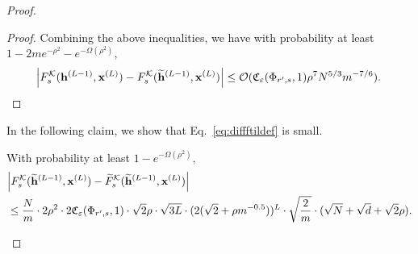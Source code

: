\begin{claim}
\begin{proof}
\begin{proof}
					
					
					Combining the above inequalities, we have with probability at least $1 - 2me^{-\rho^2} - e^{-\Omega(\rho^2)}$,
					\begin{equation*}
						\abs{F^{\mathcal{K}}_s(\mathbf{h}^{(L-1)}, \mathbf{x}^{(L)}) - F^{\mathcal{K}}_s(\widetilde{\mathbf{h}}^{(L-1)}, \mathbf{x}^{(L)})} \le \mathcal{O}( \mathfrak{C}_{\varepsilon}(\Phi_{r', s}, 1) \rho^{7} N^{5 / 3} m^{-7/6}).
					\end{equation*}
				\end{proof}
				
				
				In the following claim, we show that Eq.~\ref{eq:diffftildef} is small.      
				\begin{claim}\label{claim:diffftildef}
					With probability at least $1-e^{-\Omega(\rho^2)}$,
					\begin{align*}  &\abs{F^{\mathcal{K}}_s(\widetilde{\mathbf{h}}^{(L-1)}, \mathbf{x}^{(L)}) - \widetilde{F}^{\mathcal{K}}_s(\widetilde{\mathbf{h}}^{(L-1)}, \mathbf{x}^{(L)})} \\&
						\le \frac{N}{m} \cdot 2\rho^2 \cdot 2\mathfrak{C}_{\varepsilon}(\Phi_{r', s}, 1)  \cdot \sqrt{2} \rho \cdot \sqrt{3L} \cdot (2 (\sqrt{2} + \rho m^{-0.5}))^{L} \cdot \sqrt{\frac{2}{m}} \cdot   (\sqrt{N} + \sqrt{d} + \sqrt{2}\rho).
					\end{align*}
				\end{claim}
				

\end{proof}
\end{claim}
